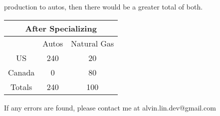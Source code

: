 \documentclass[letterpaper, 12pt]{article}
\begin{document}
production to autos, then there would be a greater total of both.
\begin{center}
  \begin{tabular}{|c|c|c|}
    \hline
    \multicolumn{3}{|c|}{After Specializing} \\ \hline
           & Autos & Natural Gas  \\ \hline
    US     & 240 & 20             \\ \hline
    Canada & 0   & 80             \\ \hline
    Totals & 240 & 100            \\ \hline
  \end{tabular}
\end{center}

\begin{center}
  If any errors are found, please contact me at alvin.lin.dev@gmail.com
\end{center}
\end{document}
